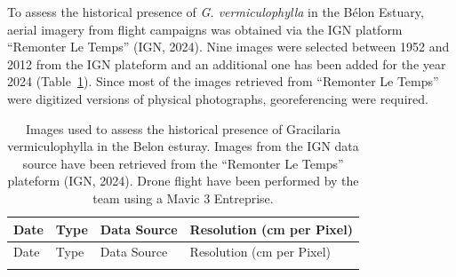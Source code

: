 \documentclass[
  letterpaper,
  DIV=11,
  numbers=noendperiod]{scrartcl}
\begin{document}
To assess the historical presence of \emph{G. vermiculophylla} in the
Bélon Estuary, aerial imagery from flight campaigns was obtained via the
IGN platform ``Remonter Le Temps'' (IGN, 2024). Nine images were
selected between 1952 and 2012 from the IGN plateform and an additional
one has been added for the year 2024 (Table~\ref{tbl-IGNimg}). Since
most of the images retrieved from ``Remonter Le Temps'' were digitized
versions of physical photographs, georeferencing were required.

\begin{longtable}[]{@{}
  >{\centering\arraybackslash}p{}
  >{\centering\arraybackslash}p{}
  >{\centering\arraybackslash}p{}
  >{\centering\arraybackslash}p{}@{}}
\caption{Images used to assess the historical presence of Gracilaria
vermiculophylla in the Belon esturay. Images from the IGN data source
have been retrieved from the ``Remonter Le Temps'' plateform (IGN,
2024). Drone flight have been performed by the team using a Mavic 3
Entreprise.}\label{tbl-IGNimg}\tabularnewline
\toprule\noalign{}
\begin{minipage}[b]{\linewidth}\centering
Date
\end{minipage} & \begin{minipage}[b]{\linewidth}\centering
Type
\end{minipage} & \begin{minipage}[b]{\linewidth}\centering
Data Source
\end{minipage} & \begin{minipage}[b]{\linewidth}\centering
Resolution (cm per Pixel)
\end{minipage} \\
\midrule\noalign{}
\endfirsthead
\toprule\noalign{}
\begin{minipage}[b]{\linewidth}\centering
Date
\end{minipage} & \begin{minipage}[b]{\linewidth}\centering
Type
\end{minipage} & \begin{minipage}[b]{\linewidth}\centering
Data Source
\end{minipage} & \begin{minipage}[b]{\linewidth}\centering
Resolution (cm per Pixel)
\end{minipage} \\
\midrule\noalign{}
\endhead

\end{longtable}
\end{document}
